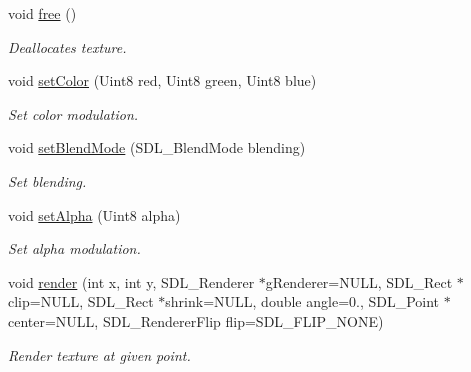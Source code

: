 \begin{DoxyCompactItemize}
\mbox{\label{class_l_texture_abef558f0b920270079925548a3976a06}} 
void \mbox{\hyperlink{class_l_texture_abef558f0b920270079925548a3976a06}{free}} ()
\begin{DoxyCompactList}\small\item\em Deallocates texture. \end{DoxyCompactList}\item 
\mbox{\label{class_l_texture_a4ccf201515ecb158b137394d41ed9077}} 
void \mbox{\hyperlink{class_l_texture_a4ccf201515ecb158b137394d41ed9077}{set\+Color}} (Uint8 red, Uint8 green, Uint8 blue)
\begin{DoxyCompactList}\small\item\em Set color modulation. \end{DoxyCompactList}\item 
\mbox{\label{class_l_texture_aa1fe07070f715bf3981c129ae1619a4e}} 
void \mbox{\hyperlink{class_l_texture_aa1fe07070f715bf3981c129ae1619a4e}{set\+Blend\+Mode}} (S\+D\+L\+\_\+\+Blend\+Mode blending)
\begin{DoxyCompactList}\small\item\em Set blending. \end{DoxyCompactList}\item 
\mbox{\label{class_l_texture_ab4e51b54752ae7b54614078f9128a9c0}} 
void \mbox{\hyperlink{class_l_texture_ab4e51b54752ae7b54614078f9128a9c0}{set\+Alpha}} (Uint8 alpha)
\begin{DoxyCompactList}\small\item\em Set alpha modulation. \end{DoxyCompactList}\item 
void \mbox{\hyperlink{class_l_texture_a76bf36b87fb2f599ec1adce3a00d2e07}{render}} (int x, int y, S\+D\+L\+\_\+\+Renderer $\ast$g\+Renderer=N\+U\+LL, S\+D\+L\+\_\+\+Rect $\ast$clip=N\+U\+LL, S\+D\+L\+\_\+\+Rect $\ast$shrink=N\+U\+LL, double angle=0., S\+D\+L\+\_\+\+Point $\ast$center=N\+U\+LL, S\+D\+L\+\_\+\+Renderer\+Flip flip=S\+D\+L\+\_\+\+F\+L\+I\+P\+\_\+\+N\+O\+NE)
\begin{DoxyCompactList}\small\item\em Render texture at given point. \end{DoxyCompactList}\item 
\mbox{\label{class_l_texture_a4382db92d25291b8723e79922e801ba1}} 

\end{DoxyCompactItemize}

